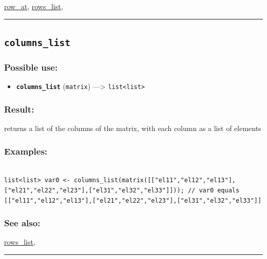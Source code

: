 \documentclass[]{book}
\providecommand{\tightlist}{%
  \setlength{\itemsep}{0pt}\setlength{\parskip}{0pt}}
\theoremstyle{definition}
\theoremstyle{definition}
\theoremstyle{definition}
\theoremstyle{remark}
\begin{document}
\href{operators-n-to-r.html\#row_at}{row\_at},
\href{operators-n-to-r.html\#rows_list}{rows\_list},

\begin{center}\rule{0.5\linewidth}{\linethickness}\end{center}

\subsection{\texorpdfstring{\texttt{columns\_list}}{columns\_list}}\label{columns_list}

\subsubsection{Possible use:}\label{possible-use-92}

\begin{itemize}
\tightlist
\item
  \textbf{\texttt{columns\_list}} (\texttt{matrix}) ---\textgreater{}
  \texttt{list\textless{}list\textgreater{}}
\end{itemize}

\subsubsection{Result:}\label{result-90}

returns a list of the columns of the matrix, with each column as a list
of elements

\subsubsection{Examples:}\label{examples-71}

\begin{verbatim}
 
list<list> var0 <- columns_list(matrix([["el11","el12","el13"],["el21","el22","el23"],["el31","el32","el33"]])); // var0 equals [["el11","el12","el13"],["el21","el22","el23"],["el31","el32","el33"]]
\end{verbatim}

\subsubsection{See also:}\label{see-also-57}

\href{operators-n-to-r.html\#rows_list}{rows\_list},

\begin{center}\rule{0.5\linewidth}{\linethickness}\end{center}
\end{document}
